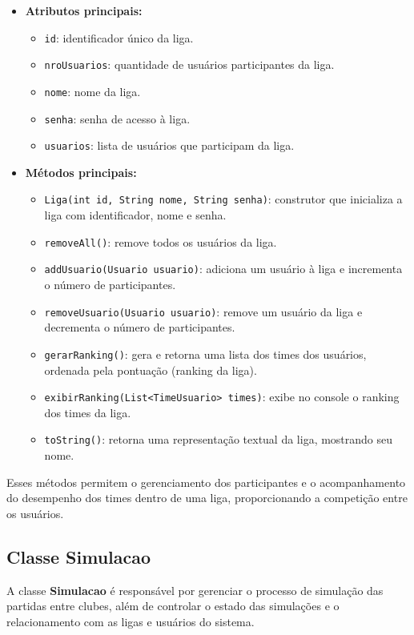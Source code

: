 \documentclass[12pt]{article}
\begin{document}
\begin{itemize}
  \item \textbf{Atributos principais:}
        \begin{itemize}
          \item \texttt{id}: identificador único da liga.
          \item \texttt{nroUsuarios}: quantidade de usuários participantes da liga.
          \item \texttt{nome}: nome da liga.
          \item \texttt{senha}: senha de acesso à liga.
          \item \texttt{usuarios}: lista de usuários que participam da liga.
        \end{itemize}
  \item \textbf{Métodos principais:}
        \begin{itemize}
          \item \texttt{Liga(int id, String nome, String senha)}: construtor que inicializa a liga com identificador, nome e senha.
          \item \texttt{removeAll()}: remove todos os usuários da liga.
          \item \texttt{addUsuario(Usuario usuario)}: adiciona um usuário à liga e incrementa o número de participantes.
          \item \texttt{removeUsuario(Usuario usuario)}: remove um usuário da liga e decrementa o número de participantes.
          \item \texttt{gerarRanking()}: gera e retorna uma lista dos times dos usuários, ordenada pela pontuação (ranking da liga).
          \item \texttt{exibirRanking(List<TimeUsuario> times)}: exibe no console o ranking dos times da liga.
          \item \texttt{toString()}: retorna uma representação textual da liga, mostrando seu nome.
        \end{itemize}
\end{itemize}

Esses métodos permitem o gerenciamento dos participantes e o acompanhamento do desempenho dos times dentro de uma liga, proporcionando a competição entre os usuários.

\subsection{Classe Simulacao}

A classe \textbf{Simulacao} é responsável por gerenciar o processo de simulação das partidas entre clubes, além de controlar o estado das simulações e o relacionamento com as ligas e usuários do sistema.
\end{document}
